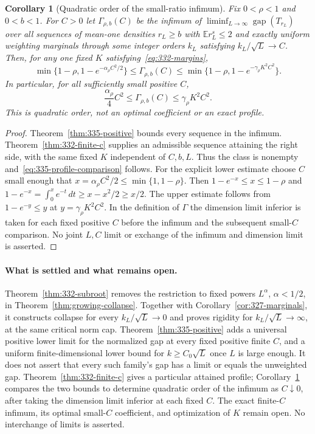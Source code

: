 \documentclass[11pt]{article}
\newtheorem{corollary}[theorem]{Corollary}
\newcommand{\gap}{\operatorname{gap}}
\begin{document}
\begin{corollary}[Quadratic order of the small-ratio infimum]
\label{cor:335-quadratic}
Fix $0<\rho<1$ and $0<b<1$. For $C>0$ let $\Gamma_{\rho,b}(C)$
be the infimum of $\liminf_{L\to\infty}\gap(T_{r_L})$ over all
sequences of mean-one densities $r_L\ge b$ with $\mathbb E r_L^s\le2$
and exactly uniform weighting marginals through some integer orders
$k_L$ satisfying $k_L/\sqrt L\to C$. Then, for any one fixed $K$
satisfying~\eqref{eq:332-margins},
\begin{equation}\label{eq:335-profile-comparison}
 \min\{1-\rho,1-e^{-\alpha_\rho C^2/2}\}
 \le\Gamma_{\rho,b}(C)
 \le\min\{1-\rho,1-e^{-\gamma_\rho K^2C^2}\}.
\end{equation}
In particular, for all sufficiently small positive $C$,
\[
 \frac{\alpha_\rho}{4}C^2
 \le\Gamma_{\rho,b}(C)\le\gamma_\rho K^2C^2.
\]
This is quadratic order, not an optimal coefficient or an exact profile.
\end{corollary}
\begin{proof}
Theorem~\ref{thm:335-positive} bounds every sequence in the infimum.
Theorem~\ref{thm:332-finite-c} supplies an admissible sequence attaining
the right side, with the same fixed $K$ independent of $C,b,L$.
Thus the class is nonempty and~\eqref{eq:335-profile-comparison} follows.
For the explicit lower estimate choose $C$ small enough that
$x=\alpha_\rho C^2/2\le\min\{1,1-\rho\}$. Then
$1-e^{-x}\le x\le1-\rho$ and
$1-e^{-x}=\int_0^x e^{-t}\,dt\ge x-x^2/2\ge x/2$.
The upper estimate follows from $1-e^{-y}\le y$ at
$y=\gamma_\rho K^2C^2$. In the definition of $\Gamma$ the dimension
limit inferior is taken for each fixed positive $C$ before the infimum
and the subsequent small-$C$ comparison. No joint $L,C$ limit or
exchange of the infimum and dimension limit is asserted.
\end{proof}


\paragraph{What is settled and what remains open.}
Theorem~\ref{thm:332-subroot} removes the restriction to fixed powers
$L^\alpha$, $\alpha<1/2$, in Theorem~\ref{thm:growing-collapse}.
Together with Corollary~\ref{cor:327-marginals}, it constructs collapse
for every $k_L/\sqrt L\to0$ and proves rigidity for
$k_L/\sqrt L\to\infty$, at the same critical norm cap.
Theorem~\ref{thm:335-positive} adds a universal positive lower limit for
the normalized gap at every fixed positive finite $C$, and a uniform
finite-dimensional lower bound for $k\ge C_0\sqrt L$ once $L$ is large
enough. It does not assert that every such family's gap has a limit or
equals the unweighted gap. Theorem~\ref{thm:332-finite-c} gives a
particular attained profile; Corollary~\ref{cor:335-quadratic} compares
the two bounds to determine quadratic order of the infimum as
$C\downarrow0$, after taking the dimension limit inferior at each fixed
$C$. The exact finite-$C$ infimum, its optimal small-$C$ coefficient,
and optimization of $K$ remain open. No interchange of limits is asserted.
\end{document}
